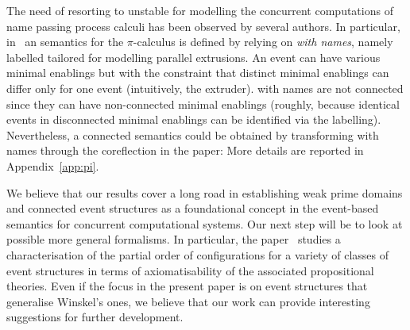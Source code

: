 
The need of resorting to unstable {\esabbr} for modelling the
concurrent computations of name passing process calculi has been
observed by several authors. In particular, in~\cite{CVY:ESSPE} an
{\esabbr} semantics for the $\pi$-calculus is defined by relying on
 {\esabbr} \emph{with names}, %
namely labelled {\esabbr} tailored for modelling
parallel extrusions. An event can have various minimal enablings but
with the constraint that distinct minimal enablings can differ only for one
event (intuitively, the extruder).
%
{\esabbr} with names are not connected {\esabbr} since they can have 
non-connected minimal enablings (roughly, because identical events in 
disconnected minimal enablings can be identified via the labelling).
% 
Nevertheless, a connected {\esabbr} semantics could be obtained by
transforming {\esabbr} with names through the coreflection in the
paper: More details are reported 
in Appendix~\ref{app:pi}.


We believe that our results cover a long road in establishing weak prime domains and 
connected event structures as a foundational concept in the event-based semantics for 
concurrent computational systems.
%
Our next step will be to look at possible more general formalisms. 
In particular, the paper~\cite{GP:CSESPN} studies a characterisation 
of the partial order of configurations for a variety of classes of event
structures in terms of axiomatisability of the associated
propositional theories. Even if the focus in the present paper is 
on event structures that generalise Winskel's ones, we believe that
our work can provide interesting suggestions for
further development.

